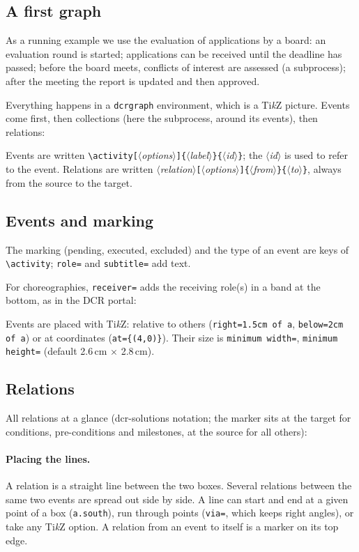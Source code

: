 \documentclass[a4paper,11pt]{article}
\newcommand\example[1]{%
  \begin{tcolorbox}[colback=white, colframe=black!25, boxrule=0.4pt,
      arc=1mm, left=2mm, right=2mm, halign lower=flush center]
    
    \tcblower
    
  \end{tcolorbox}}
\newcommand\cs[1]{\texttt{\textbackslash#1}}
\newcommand\key[1]{\texttt{#1}}
\newcommand\meta[1]{\ensuremath{\langle}\textit{#1}\ensuremath{\rangle}}
\newcommand\marg[1]{\texttt{\{}\meta{#1}\texttt{\}}}
\newcommand\oarg[1]{\texttt{[}\meta{#1}\texttt{]}}
\begin{document}
\subsection{A first graph}
As a running example we use the evaluation of applications by a board:
an evaluation round is started; applications can be received until the
deadline has passed; before the board meets, conflicts of interest are
assessed (a subprocess); after the meeting the report is updated and then
approved.

Everything happens in a \texttt{dcrgraph} environment, which is a
Ti\emph{k}Z picture. Events come first, then collections (here the
subprocess, around its events), then relations:
\example{opening}
Events are written \cs{activity}\oarg{options}\marg{label}\marg{id}; the
\meta{id} is used to refer to the event. Relations are written
\meta{relation}\oarg{options}\marg{from}\marg{to}, always from the source
to the target.

\subsection{Events and marking}
The marking (pending, executed, excluded) and the type of an event are
keys of \cs{activity}; \key{role=} and \key{subtitle=} add text.
\example{events}
For choreographies, \key{receiver=} adds the receiving role(s) in a band at
the bottom, as in the DCR portal:
\example{receivers}
Events are placed with Ti\emph{k}Z: relative to others
(\key{right=1.5cm of a}, \key{below=2cm of a}) or at coordinates
(\key{at=\{(4,0)\}}). Their size is \key{minimum width=}, \key{minimum height=}
(default 2.6\,cm $\times$ 2.8\,cm).

\subsection{Relations}
All relations at a glance (dcr-solutions notation; the marker sits at the target
for conditions, pre-conditions and milestones, at the source for all
others):
\example{relations-all}

\paragraph{Placing the lines.}\mbox{}\par
A relation is a straight line between the two boxes. Several relations
between the same two events are spread out side by side. A line can start
and end at a given point of a box (\key{a.south}), run through points
(\key{via=}, which keeps right angles), or take any Ti\emph{k}Z option.
A relation from an event to itself is a marker on its top edge.
\example{routing}
\end{document}
